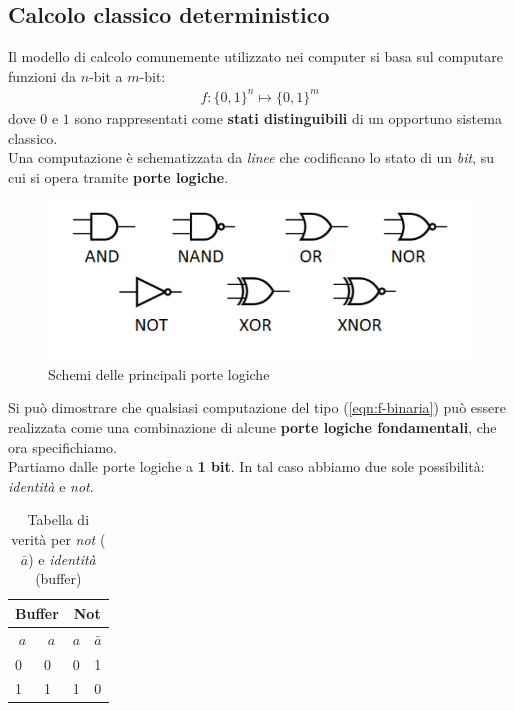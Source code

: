\documentclass[../../InformazioneQuantistica.tex]{subfiles}
\begin{document}
\subsection{Calcolo classico deterministico}
Il modello di calcolo comunemente utilizzato nei computer si basa sul computare funzioni da $n$-bit a $m$-bit:
\begin{align}
f: \{0,1\}^n \mapsto \{0,1\}^m
\label{eqn:f-binaria}
\end{align}
dove $0$ e $1$ sono rappresentati come \textbf{stati distinguibili} di un opportuno sistema classico.\\
Una computazione è schematizzata da \textit{linee} che codificano lo stato di un \textit{bit}, su cui si opera tramite \textbf{porte logiche}. 
\begin{figure}[H]
\centering
\includegraphics[scale=0.5]{Immagini/27_2/image001.png}
\caption{Schemi delle principali porte logiche\label{fig:porte-logiche}}
\end{figure}
Si può dimostrare che qualsiasi computazione del tipo (\ref{eqn:f-binaria}) può essere realizzata come una combinazione di alcune \textbf{porte logiche fondamentali}, che ora specifichiamo.\\

Partiamo dalle {porte logiche} a \textbf{1 bit}. In tal caso abbiamo due sole possibilità: \textit{identità} e \textit{not}.

\begin{table}[H]
\centering
\begin{tabular}{@{}ll|ll@{}}
\toprule
\multicolumn{2}{c|}{\textbf{Buffer}} & \multicolumn{2}{c|}{\textbf{Not}} \\ \midrule
\multicolumn{1}{c}{$a$} & \multicolumn{1}{c|}{$a$} & \multicolumn{1}{c}{$a$} & \multicolumn{1}{c}{$\bar{a}$} \\
0 & 0 & 0 & 1 \\
1 & 1 & 1 & 0 \\ \bottomrule
\end{tabular}
\caption{Tabella di verità per \textit{not} ($\bar{a}$) e \textit{identità} (buffer)}
\label{tab:notbuffer}
\end{table}
\end{document}
